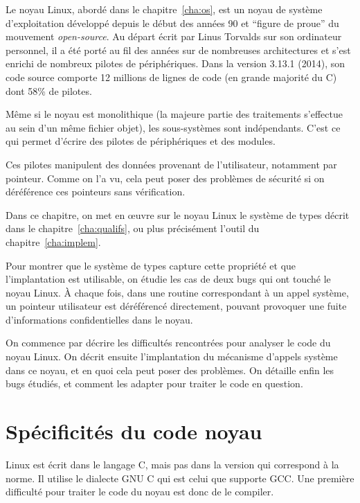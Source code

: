 
Le noyau Linux, abordé dans le chapitre~\ref{cha:os}, est un noyau de système
d'exploitation développé depuis le début des années 90 et \enquote{figure de
proue} du mouvement \emph{open-source}. Au départ écrit par Linus Torvalds sur
son ordinateur personnel, il a été porté au fil des années sur de nombreuses
architectures et s'est enrichi de nombreux pilotes de périphériques. Dans la
version 3.13.1 (2014), son code source comporte 12 millions de lignes de code
(en grande majorité du C) dont 58\% de pilotes.


Même si le noyau est monolithique (la majeure partie des traitements s'effectue
au sein d'un même fichier objet), les sous-systèmes sont indépendants. C'est ce
qui permet d'écrire des pilotes de périphériques et des modules.

Ces pilotes manipulent des données provenant de l'utilisateur, notamment par
pointeur. Comme on l'a vu, cela peut poser des problèmes de sécurité si on
déréférence ces pointeurs sans vérification.

Dans ce chapitre, on met en œuvre sur le noyau Linux le système de types décrit
dans le chapitre~\ref{cha:qualifs}, ou plus précisément l'outil \ptrtype du
chapitre~\ref{cha:implem}.

Pour montrer que le système de types capture cette propriété et que
l'implantation est utilisable, on étudie les cas de deux bugs qui ont touché le
noyau Linux. À chaque fois, dans une routine correspondant à un appel système,
un pointeur utilisateur est déréférencé directement, pouvant provoquer une fuite
d'informations confidentielles dans le noyau.

On commence par décrire les difficultés rencontrées pour analyser le code du
noyau Linux. On décrit ensuite l'implantation du mécanisme d'appels système dans
ce noyau, et en quoi cela peut poser des problèmes. On détaille enfin les bugs
étudiés, et comment les adapter pour traiter le code en question.

\section{Spécificités du code noyau}
\label{sec:gnuc}

Linux est écrit dans le langage C, mais pas dans la version qui correspond à la
norme. Il utilise le dialecte GNU C qui est celui que supporte GCC. Une première
difficulté pour traiter le code du noyau est donc de le compiler.

